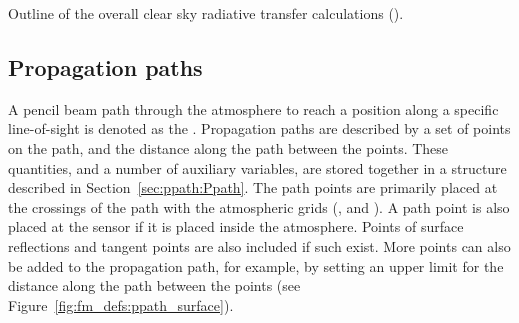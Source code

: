 \begin{algorithm}[!t]
 \begin{algorithmic}
   \ENDFOR
  \ENDFOR
 \end{algorithmic}
 \caption{Outline of the overall clear sky radiative transfer calculations
   ().}
 \label{alg:fm_defs:RteCalc}
\end{algorithm}


\subsection{Propagation paths}
\label{sec:fm_defs:ppaths}

A pencil beam path through the atmosphere to reach a position along a
specific line-of-sight is denoted as the .
Propagation paths are described by a set of points on the path, and
the distance along the path between the points. These quantities, and
a number of auxiliary variables, are stored together in a structure
described in Section~\ref{sec:ppath:Ppath}. The path points are
primarily placed at the crossings of the path with the atmospheric
grids (,  and
). A path point is also placed at the sensor if
it is placed inside the atmosphere.  Points of surface reflections and
tangent points are also included if such exist. More points can also
be added to the propagation path, for example, by setting an upper
limit for the distance along the path between the points (see
Figure~\ref{fig:fm_defs:ppath_surface}).

